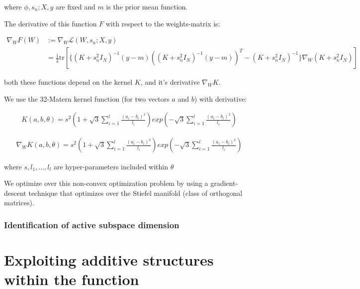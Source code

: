 where $\phi, s_n; X, y$ are fixed and $m$ is the prior mean function.

The derivative of this function $F$ with respect to the weights-matrix is:

\begin{align}
\nabla_W F(W) &:= \nabla_W \mathcal{L}(W, s_n; X, y) \\
& = \frac{1}{2} \text{tr} \left[ \{ (K + s_n^2 I_N)^{-1} (y-m) \left( (K + s_n^2 I_N)^{-1} (y-m) \right)^T - (K + s_n^2 I_N)^{-1} \} \nabla_W (K + s_n^2 I_N) \right]
\end{align}

both these functions depend on the kernel $K$, and it's derivative $\nabla_W K$.

We use the 32-Matern kernel function (for two vectors $a$ and $b$) with derivative:

\begin{align}
K(a,  b, \theta) = s^2 \left( 1 + \sqrt{3} \sum_{i=1}^l \frac{(a_i - b_i)^2}{ \textit{l}_i} \right) exp\left( - \sqrt{3} \sum_{i=1}^l \frac{(a_i - b_i)^2}{ \textit{l}_i} \right)
\end{align}

\begin{align}
\nabla_W K(a,  b, \theta) = s^2 \left( 1 + \sqrt{3} \sum_{i=1}^l \frac{(a_i - b_i)^2}{ \textit{l}_i} \right) exp\left( - \sqrt{3} \sum_{i=1}^l \frac{(a_i - b_i)^2}{ \textit{l}_i} \right)
\end{align}

where $s, l_1, \ldots, l_l $ are hyper-parameters included within $\theta$

We optimize over this non-convex optimization problem by using a gradient-descent technique that optimizes over the Stiefel manifold (class of orthogonal matrices).



\subsubsection{Identification of active subspace dimension }



\section{Exploiting additive structures within the function}

